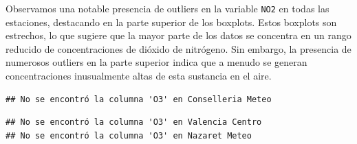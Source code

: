 \documentclass[
]{article}
\newenvironment{Shaded}{\begin{snugshade}}{\end{snugshade}}
\newcommand{\AttributeTok}[1]{\textcolor[rgb]{0.13,0.29,0.53}{#1}}
\newcommand{\ControlFlowTok}[1]{\textcolor[rgb]{0.13,0.29,0.53}{\textbf{#1}}}
\newcommand{\DecValTok}[1]{\textcolor[rgb]{0.00,0.00,0.81}{#1}}
\newcommand{\FloatTok}[1]{\textcolor[rgb]{0.00,0.00,0.81}{#1}}
\newcommand{\FunctionTok}[1]{\textcolor[rgb]{0.13,0.29,0.53}{\textbf{#1}}}
\newcommand{\NormalTok}[1]{#1}
\newcommand{\OtherTok}[1]{\textcolor[rgb]{0.56,0.35,0.01}{#1}}
\newcommand{\SpecialCharTok}[1]{\textcolor[rgb]{0.81,0.36,0.00}{\textbf{#1}}}
\newcommand{\StringTok}[1]{\textcolor[rgb]{0.31,0.60,0.02}{#1}}
\begin{document}
Observamos una notable presencia de outliers en la variable \texttt{NO2}
en todas las estaciones, destacando en la parte superior de los
boxplots. Estos boxplots son estrechos, lo que sugiere que la mayor
parte de los datos se concentra en un rango reducido de concentraciones
de dióxido de nitrógeno. Sin embargo, la presencia de numerosos outliers
en la parte superior indica que a menudo se generan concentraciones
inusualmente altas de esta sustancia en el aire.

\begin{Shaded}
\end{Shaded}

\begin{verbatim}
## No se encontró la columna 'O3' en Conselleria Meteo
\end{verbatim}

\begin{verbatim}
## No se encontró la columna 'O3' en Valencia Centro 
## No se encontró la columna 'O3' en Nazaret Meteo
\end{verbatim}
\end{document}
